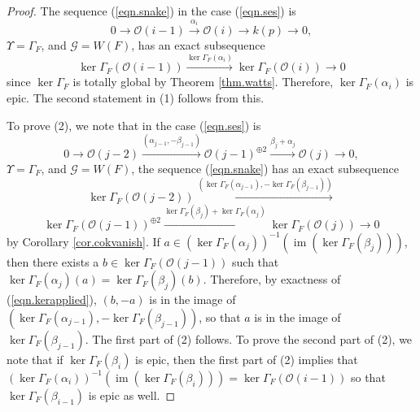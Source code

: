 \documentclass[10pt]{amsart}
\theoremstyle{definition}
\theoremstyle{remark}
\numberwithin{equation}{section}
\begin{document}
\begin{proof}
The sequence (\ref{eqn.snake}) in the case (\ref{eqn.ses}) is
$$
0 \rightarrow \mathcal{O}(i-1) \overset{\alpha_{i}}{\rightarrow} \mathcal{O}(i) \rightarrow k(p) \rightarrow 0,
$$
$\Upsilon=\Gamma_{F}$, and $\mathcal{G}=W(F)$, has an exact subsequence
$$
{\operatorname{ker }\Gamma_{F}}(\mathcal{O}(i-1)) \overset{{\operatorname{ker }\Gamma_{F}}(\alpha_{i})}{\rightarrow} {\operatorname{ker }\Gamma_{F}}(\mathcal{O}(i)) \rightarrow 0
$$
since ${\operatorname{ker }\Gamma_{F}}$ is totally global by Theorem \ref{thm.watts}.  Therefore, ${\operatorname{ker }\Gamma_{F}}(\alpha_{i})$ is epic.  The second statement in (1) follows from this.

To prove (2), we note that in the case (\ref{eqn.ses}) is
\begin{equation} \label{eqn.vect}
0 \longrightarrow \mathcal{O}(j-2)
\overset{(\alpha_{j-1},-\beta_{j-1})}{\longrightarrow}
\mathcal{O}(j-1)^{\oplus 2}
\overset{\beta_{j}+\alpha_{j}}{\longrightarrow} \mathcal{O}(j)
\longrightarrow 0,
\end{equation}
$\Upsilon=\Gamma_{F}$, and $\mathcal{G}=W(F)$, the sequence (\ref{eqn.snake}) has an exact subsequence
\begin{equation} \label{eqn.kerapplied}
{\operatorname{ker }\Gamma_{F}}(\mathcal{O}(j-2))
\overset{({\operatorname{ker }\Gamma_{F}}(\alpha_{j-1}),-{\operatorname{ker }\Gamma_{F}}(\beta_{j-1}))}{\longrightarrow}
\end{equation}
$$
{\operatorname{ker }\Gamma_{F}}(\mathcal{O}(j-1))^{\oplus 2}
\overset{{\operatorname{ker }\Gamma_{F}}(\beta_{j})+{\operatorname{ker }\Gamma_{F}}(\alpha_{j})}{\longrightarrow} {\operatorname{ker }\Gamma_{F}}(\mathcal{O}(j))
\longrightarrow 0
$$
by Corollary \ref{cor.cokvanish}.  If $a \in ({\operatorname{ker }\Gamma_{F}}(\alpha_{j}))^{-1}(\operatorname{im }({\operatorname{ker }\Gamma_{F}}(\beta_{j})))$, then there exists a $b \in {\operatorname{ker }\Gamma_{F}}(\mathcal{O}(j-1))$ such that ${\operatorname{ker }\Gamma_{F}}(\alpha_{j})(a)={\operatorname{ker }\Gamma_{F}}(\beta_{j})(b)$. Therefore, by exactness of (\ref{eqn.kerapplied}), $(b,-a)$ is in the image of $({\operatorname{ker }\Gamma_{F}}(\alpha_{j-1}),-{\operatorname{ker }\Gamma_{F}}(\beta_{j-1}))$, so that $a$ is in the image of ${\operatorname{ker }\Gamma_{F}}(\beta_{j-1})$.  The first part of (2) follows.  To prove the second part of (2), we note that if ${\operatorname{ker }\Gamma_{F}}(\beta_{i})$ is epic, then the first part of (2) implies that $({\operatorname{ker }\Gamma_{F}}(\alpha_{i}))^{-1}(\operatorname{im }({\operatorname{ker }\Gamma_{F}}(\beta_{i})))={\operatorname{ker }\Gamma_{F}}(\mathcal{O}(i-1))$ so that ${\operatorname{ker }\Gamma_{F}}(\beta_{i-1})$ is epic as well.
\end{proof}
\end{document}
